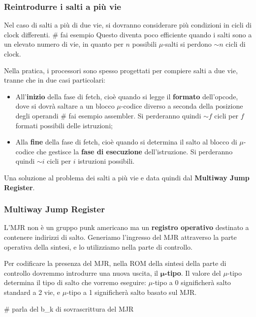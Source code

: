 \documentclass[a4paper,11pt]{article}
\begin{document}
\subsubsection{Reintrodurre i salti a più vie}
Nel caso di salti a più di due vie, si dovranno considerare più condizioni in cicli di clock differenti.
# fai esempio
Questo diventa poco efficiente quando i salti sono a un elevato numero di vie, in quanto per $n$ possibili $\mu$-salti si perdono $\sim n$ cicli di clock.

Nella pratica, i processori sono spesso progettati per compiere salti a due vie, tranne che in due casi particolari:
\begin{itemize}
	\item All'\textbf{inizio} della fase di fetch, cioè quando si legge il \textbf{formato} dell'opcode, dove si dovrà saltare a un blocco $\mu$-codice diverso a seconda della posizione degli operandi # fai esempio assembler.
		Si perderanno quindi $\sim f$ cicli per $f$ formati possibili delle istruzioni;
	\item Alla \textbf{fine} della fase di fetch, cioè quando si determina il salto al blocco di $\mu$-codice che gestisce la \textbf{fase di esecuzione} dell'istruzione.
		Si perderanno quindi $\sim i$ cicli per $i$ istruzioni possibili.
\end{itemize}
Una soluzione al problema dei salti a più vie e data quindi dal \textbf{Multiway Jump Register}.

\subsubsection{Multiway Jump Register}
L'MJR non è un gruppo punk americano ma un \textbf{registro operativo} destinato a contenere indirizzi di salto.
Generiamo l'ingresso del MJR attraverso la parte operativa della sintesi, e lo utilizziamo nella parte di controllo.

Per codificare la presenza del MJR, nella ROM della sintesi della parte di controllo dovremmo introdurre una nuova uscita, il $\boldsymbol{\mu}$\textbf{-tipo}.
Il valore del $\mu$-tipo determina il tipo di salto che vorremo eseguire: $\mu$-tipo a 0 significherà salto standard a 2 vie, e $\mu$-tipo a 1 significherà salto basato sul MJR.

# parla del b\_k di sovrascrittura del MJR
\end{document}
